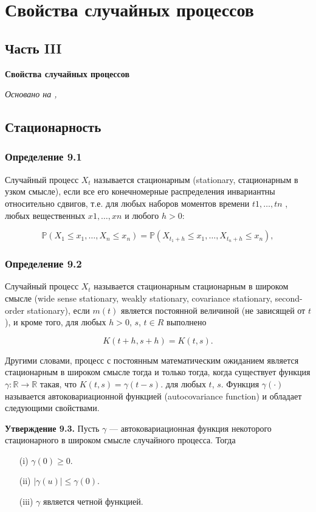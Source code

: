 \chapter{Свойства случайных процессов}
\section*{Часть III} \textbf{Свойства случайных процессов}

\textit{Основано на \cite{adeshereKorrelyaciyaMezhduVremennymi2021},
\cite{panovTeoriyaSluchaynyhProcessov2018}}

\section{Стационарность}
\subsection*{Определение 9.1} Случайный процесс \( X_t \) называется
стационарным (stationary, стационарным в узком смысле), если все его
конечномерные распределения инвариантны относительно сдвигов, т.е.
для любых наборов моментов времени $t1 , \dots, tn$ , любых вещественных
$x1 , \dots, xn$ и любого $h > 0$:

\[ \mathbb{P}(X_{1} \leq x_{1}, \ldots, X_{n} \leq x_{n}) =
\mathbb{P}(X_{t_1 + h} \leq x_{1}, \ldots, X_{t_n + h} \leq x_{n}), \]

\subsection*{Определение 9.2} Случайный процесс \( X_t \) называется
стационарным стационарным в широком смысле (wide sense stationary,
  weakly stationary, covariance stationary,
second-order stationary), если $m(t)$ является постоянной величиной
(не зависящей от $t$), и кроме того, для любых $h > 0$, $s$, $t \in R$ выполнено

\[ K(t + h, s + h) = K(t, s). \]

Другими словами, процесс с постоянным математическим ожиданием
является стационарным в широком смысле тогда и только тогда, когда
существует функция $ \gamma : \mathbb{R} \to \mathbb{R} $ такая, что $
K(t, s) = \gamma(t-s). $ для любых $t$, $s$. Функция $ \gamma
(\cdot) $ называется автоковариационной функцией
(autocovariance function)
и обладает следующими свойствами.

\textbf{Утверждение 9.3.} Пусть $\gamma$ — автоковариационная функция
некоторого стационарного в широком смысле случайного процесса. Тогда
\begin{itemize}
  \item[(i)] $\gamma(0) \geq 0$.
  \item[(ii)] $|\gamma(u)| \leq \gamma(0)$.
  \item[(iii)] $\gamma$ является четной функцией.
\end{itemize}

